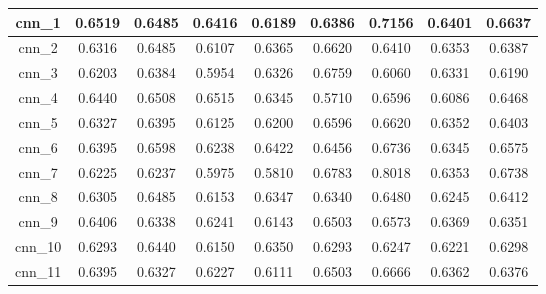 \begin{table}[p]
\begin{tabular} {|c|c|c|c|c|c|c|c|c| }
        cnn\_1   & 0.6519                        & 0.6485                         & 0.6416                      & 0.6189                  & 0.6386 & 0.7156 & 0.6401 & 0.6637 \\ \hline
        cnn\_2   & 0.6316                        & 0.6485                         & 0.6107                      & 0.6365                  & 0.6620 & 0.6410 & 0.6353 & 0.6387 \\ \hline
        cnn\_3   & 0.6203                        & 0.6384                         & 0.5954                      & 0.6326                  & 0.6759 & 0.6060 & 0.6331 & 0.6190 \\ \hline
        cnn\_4   & 0.6440                        & 0.6508                         & 0.6515                      & 0.6345                  & 0.5710 & 0.6596 & 0.6086 & 0.6468 \\ \hline
        cnn\_5   & 0.6327                        & 0.6395                         & 0.6125                      & 0.6200                  & 0.6596 & 0.6620 & 0.6352 & 0.6403 \\ \hline
        cnn\_6   & 0.6395                        & 0.6598                         & 0.6238                      & 0.6422                  & 0.6456 & 0.6736 & 0.6345 & 0.6575 \\ \hline
        cnn\_7   & 0.6225                        & 0.6237                         & 0.5975                      & 0.5810                  & 0.6783 & 0.8018 & 0.6353 & 0.6738 \\ \hline
        cnn\_8   & 0.6305                        & 0.6485                         & 0.6153                      & 0.6347                  & 0.6340 & 0.6480 & 0.6245 & 0.6412 \\ \hline
        cnn\_9   & 0.6406                        & 0.6338                         & 0.6241                      & 0.6143                  & 0.6503 & 0.6573 & 0.6369 & 0.6351 \\ \hline
        cnn\_10  & 0.6293                        & 0.6440                         & 0.6150                      & 0.6350                  & 0.6293 & 0.6247 & 0.6221 & 0.6298 \\ \hline
        cnn\_11  & 0.6395                        & 0.6327                         & 0.6227                      & 0.6111                  & 0.6503 & 0.6666 & 0.6362 & 0.6376 \\ \hline
    \end{tabular}
\end{table}


